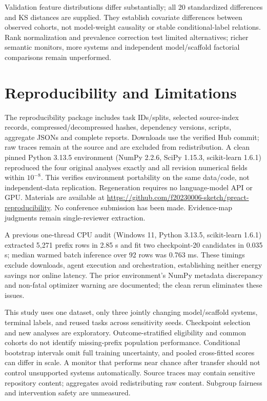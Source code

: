 \documentclass[conference]{IEEEtran}
\begin{document}
Validation feature distributions differ substantially; all 20 standardized differences and KS distances are supplied. They establish covariate differences between observed cohorts, not model-weight causality or stable conditional-label relations. Rank normalization and prevalence correction test limited alternatives; richer semantic monitors, more systems and independent model/scaffold factorial comparisons remain unperformed.

\section{Reproducibility and Limitations}
The reproducibility package includes task IDs/splits, selected source-index records, compressed/decompressed hashes, dependency versions, scripts, aggregate JSONs and complete reports. Downloads use the verified Hub commit; raw traces remain at the source and are excluded from redistribution. A clean pinned Python 3.13.5 environment (NumPy 2.2.6, SciPy 1.15.3, scikit-learn 1.6.1) reproduced the four original analyses exactly and all revision numerical fields within $10^{-8}$. This verifies environment portability on the same data/code, not independent-data replication. Regeneration requires no language-model API or GPU. Materials are available at \url{https://github.com/f20230006-sketch/preact-reproducibility}. No conference submission has been made. Evidence-map judgments remain single-reviewer extraction.

A previous one-thread CPU audit (Windows 11, Python 3.13.5, scikit-learn 1.6.1) extracted 5,271 prefix rows in 2.85 s and fit two checkpoint-20 candidates in 0.035 s; median warmed batch inference over 92 rows was 0.763 ms. These timings exclude downloads, agent execution and orchestration, establishing neither energy savings nor online latency. The prior environment's NumPy metadata discrepancy and non-fatal optimizer warning are documented; the clean rerun eliminates these issues.

This study uses one dataset, only three jointly changing model/scaffold systems, terminal labels, and reused tasks across sensitivity seeds. Checkpoint selection and new analyses are exploratory. Outcome-stratified eligibility and common cohorts do not identify missing-prefix population performance. Conditional bootstrap intervals omit full training uncertainty, and pooled cross-fitted scores can differ in scale. A monitor that performs near chance after transfer should not control unsupported systems automatically. Source traces may contain sensitive repository content; aggregates avoid redistributing raw content. Subgroup fairness and intervention safety are unmeasured.
\end{document}
